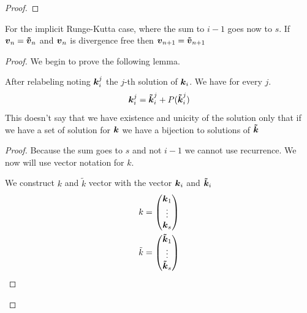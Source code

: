 \begin{proof}
\end{proof}

\begin{theorem}
For the implicit Runge-Kutta case, where the sum to $i-1$ goes now to $s$.
If ${\boldsymbol {v}}_{n}={\boldsymbol {\tilde{v}}}_{n}$ and ${\boldsymbol {v}}_n$ is divergence free then ${\boldsymbol {v}}_{n+1}={\boldsymbol {\tilde{v}}}_{n+1}$ 
\end{theorem}
\begin{proof}
We begin to prove the following lemma.
\begin{lemma}
After relabeling noting ${\boldsymbol {k}}_{i}^{j}$ the $j$-th solution of ${\boldsymbol {k}}_{i}$.
We have for every $j$.
\begin{equation}
  {\boldsymbol {k}}_{i}^{j}={\boldsymbol {\tilde{k}}}_{i}^{j}+P({\boldsymbol {\tilde{k}}}_{i}^{j})
\end{equation}
This doesn't say that we have existence and unicity of the solution only that if we have a set of solution for ${\boldsymbol {k}}$ we have a bijection
to solutions of ${\boldsymbol {\tilde{k}}}$
\end{lemma}
\begin{proof}
Because the sum goes to $s$ and not $i-1$ we cannot use recurrence.
We now will use vector notation for $k$.

We construct $k$ and $\tilde{k}$ vector with the vector ${\boldsymbol {k}}_{i}$ and ${\boldsymbol {\tilde{k}}}_{i}$
\begin{align}
k&=\begin{pmatrix}
    {\boldsymbol {k}}_{1}\\
    \vdots\\
    {\boldsymbol {k}}_{s}\\
  \end{pmatrix}\\
\tilde{k}&=\begin{pmatrix}
    {\boldsymbol {\tilde{k}}}_{1}\\
    \vdots\\
    {\boldsymbol {\tilde{k}}}_{s}\\
  \end{pmatrix}
\end{align}


\end{proof}
\end{proof}

